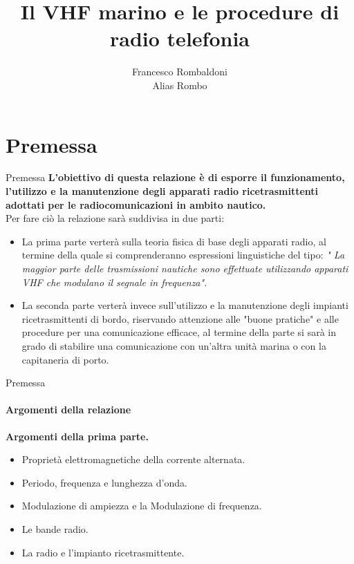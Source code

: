 \documentclass[aspectratio=169]{beamer}
\title{Il VHF marino e le procedure di radio telefonia}
\author{Francesco Rombaldoni\\
Alias Rombo}
\date{}
\institute{Università degli Studi di Urbino "Carlo Bo"}
\begin{document}
	
	\begin{frame} 
		\maketitle 		
	\end{frame}
	
	\begin{frame}
		\tableofcontents
	\end{frame}

	\section{Premessa}
	
	\begin{frame}{Premessa}
		\textbf{L'obiettivo di questa relazione è di esporre il funzionamento, l'utilizzo e la manutenzione degli apparati radio ricetrasmittenti adottati per le radiocomunicazioni in ambito nautico.}\\
		\bigskip
		Per fare ciò la relazione sarà suddivisa in due parti:\\
		\begin{itemize}
			\item La prima parte verterà sulla teoria fisica di base degli apparati radio, al termine della quale si comprenderanno espressioni linguistiche del tipo: \emph{" La maggior parte delle trasmissioni nautiche sono effettuate utilizzando apparati VHF che modulano il segnale in frequenza"}.\\
			\item La seconda parte verterà invece sull'utilizzo e la manutenzione degli impianti ricetrasmittenti di bordo, riservando attenzione alle "buone pratiche" e alle procedure per una comunicazione efficace, al termine della parte si sarà in grado di stabilire una comunicazione con un'altra unità marina o con la capitaneria di porto.
		\end{itemize}
	\end{frame}

	\begin{frame}{Premessa}
		\framesubtitle{Argomenti della relazione}
		\textbf{Argomenti della prima parte.}
		\begin{itemize}
			\item Proprietà elettromagnetiche della corrente alternata.
			\item Periodo, frequenza e lunghezza d'onda.
			\item Modulazione di ampiezza e la Modulazione di frequenza.
			\item Le bande radio.
			\item La radio e l'impianto ricetrasmittente.
		\end{itemize}
	\end{frame}
\end{document}
